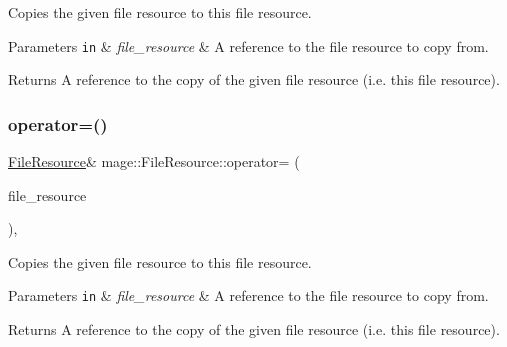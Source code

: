 Copies the given file resource to this file resource.


\begin{DoxyParams}[1]{Parameters}
\mbox{\tt in}  & {\em file\+\_\+resource} & A reference to the file resource to copy from. \\
\hline
\end{DoxyParams}
\begin{DoxyReturn}{Returns}
A reference to the copy of the given file resource (i.\+e. this file resource). 
\end{DoxyReturn}
\hypertarget{classmage_1_1_file_resource_a7ec207d6e9cb0bc4b8020aa73df986b6}{}\label{classmage_1_1_file_resource_a7ec207d6e9cb0bc4b8020aa73df986b6} 
\subsubsection{\texorpdfstring{operator=()}{operator=()}\hspace{0.1cm}{\footnotesize\ttfamily [2/2]}}
{\footnotesize\ttfamily \hyperlink{classmage_1_1_file_resource}{File\+Resource}\& mage\+::\+File\+Resource\+::operator= (\begin{DoxyParamCaption}\item[{\hyperlink{classmage_1_1_file_resource}{File\+Resource} \&\&}]{file\+\_\+resource }\end{DoxyParamCaption})\hspace{0.3cm}{\ttfamily [private]}, {\ttfamily [delete]}}

Copies the given file resource to this file resource.


\begin{DoxyParams}[1]{Parameters}
\mbox{\tt in}  & {\em file\+\_\+resource} & A reference to the file resource to copy from. \\
\hline
\end{DoxyParams}
\begin{DoxyReturn}{Returns}
A reference to the copy of the given file resource (i.\+e. this file resource). 
\end{DoxyReturn}
